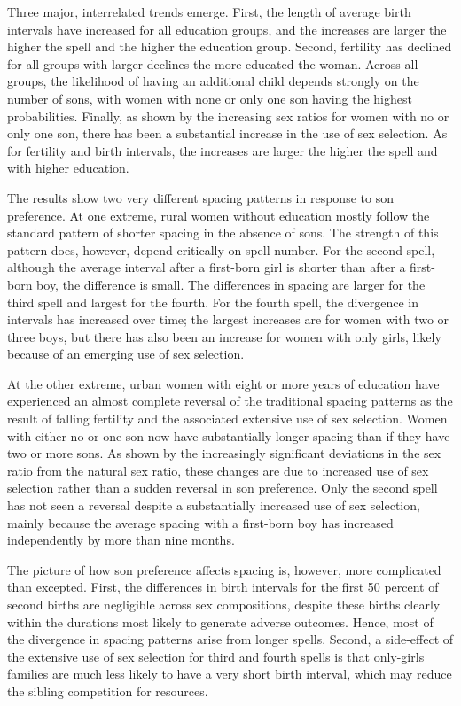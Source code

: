 \documentclass[12pt,letterpaper]{article}
\begin{document}
Three major, interrelated trends emerge.
First, 
the length of average birth intervals have increased for all education groups, and
the increases are larger the higher the spell and the higher the education group.
Second, fertility has declined for all groups with larger declines the more educated the 
woman.
Across all groups, the likelihood of having an additional child depends strongly on the 
number of sons, with women with none or only one son having the highest probabilities.
Finally, as shown by the increasing sex ratios for women with no or only one son, there
has been a substantial increase in the use of sex selection.
As for fertility and birth intervals, the increases are larger the higher the spell and
with higher education.

The results show two very different spacing patterns in response to son preference.
At one extreme, rural women without education mostly follow the standard pattern of 
shorter spacing in the absence of sons.
The strength of this pattern does, however, depend critically on spell number.
For the second spell, although the average interval after a first-born girl is shorter
than after a first-born boy, the difference is small.
The differences in spacing are larger for the third spell and largest for the fourth.
For the fourth spell, the divergence in intervals has increased over time; the largest 
increases are for women with two or three boys, but there has also been an increase for 
women with only girls, likely because of an emerging use of sex selection.

At the other extreme, urban women with eight or more years of education have experienced 
an almost complete reversal of the traditional spacing patterns as the result of falling
fertility and the associated extensive use of sex selection.
Women with either no or one son now have substantially longer spacing than if they have 
two or more sons.
As shown by the increasingly significant deviations in the sex ratio from the natural sex 
ratio, these changes are due to increased use of sex selection rather than a sudden
reversal in son preference.
Only the second spell has not seen a reversal despite a substantially increased use of
sex selection, mainly because the average spacing with a first-born boy has increased 
independently by more than nine months.

The picture of how son preference affects spacing is, however, more complicated than 
excepted.
First, the differences in birth intervals for the first 50 percent of second births are 
negligible across sex compositions, despite these births clearly within the 
durations most likely to generate adverse outcomes.
Hence, most of the divergence in spacing patterns arise from longer spells.
Second, a side-effect of the extensive use of sex selection for third and fourth 
spells is that only-girls families are much less likely to have a very short birth 
interval, which may reduce the sibling competition for resources.
\end{document}

